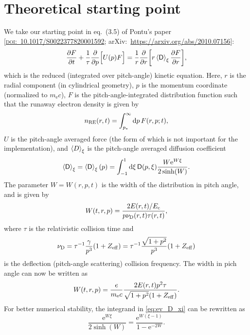 \documentclass[11pt,a4paper,english
]{article}
\newcommand{\ee}{\mathrm{e}}
\newcommand{\nRE}{\ensuremath{n_{\rm RE}}}
\newcommand{\nuD}{\ensuremath{\nu_{\rm D}}}
\newcommand{\nus}{\ensuremath{\nu_{\rm s}}}
\begin{document}
\section{Theoretical starting point}
We take our starting point in eq.~(3.5) of Pontu's paper
[\href{https://doi.org/10.1017/S0022377820001592}{\textsc{doi}:~10.1017/S0022377820001592};
arXiv:~\url{https://arxiv.org/abs/2010.07156}]:
\begin{equation}\label{eq:reduced-kinetic}
\pdv{F}{t}+\frac{1}{\tau}\pdv{p}\qty[\Big.U(p)F]
=\frac{1}{r}\pdv{r}\qty[r\ev{\mathsf{D}}_\xi\pdv{F}{r}],
\end{equation}
which is the reduced (integrated over pitch-angle) kinetic
equation. Here, $r$ is the radial component (in cylindrical geometry),
$p$ is the momentum coordinate (normalized to $m_{\ee}c$), $F$ is the
pitch-angle-integrated distribution function such that the runaway
electron density is given by
\begin{equation}
\nRE(r,t) = \int_{p_*}^{\infty}\dd{p}F(r,p;t),
\end{equation}
$U$ is the pitch-angle averaged force (the form of which is not
important for the implementation),
and $\ev{D}_{\xi}$ is the pitch-angle averaged diffusion coefficient
\begin{equation}\label{eq:ev_D_xi}
\ev{\mathsf{D}}_{\xi}=\ev{\mathsf{D}}_{\xi}(p)
=\int_{-1}^{1}\dd{\xi} \mathsf{D}(p,\xi)\frac{W\ee^{W\xi}}{2\sinh(W)}.
\end{equation}
The parameter $W=W(r,p,t)$ is the width of the distribution in pitch
angle, and is given by
\begin{equation}
W(t,r,p) = \frac{2E(r,t)/E_{\rm c}}{p\nuD(r,t)\tau(r,t)},
\end{equation}
where $\tau$ is the relativistic collision time and
\begin{equation}
\nuD = \tau^{-1}\frac{\gamma}{p^3}(1+Z_{\rm eff})
= \tau^{-1}\frac{\sqrt{1+p^2}}{p^3}(1+Z_{\rm eff})
\end{equation}
is the deflection (pitch-angle scattering) collision
frequency. The width in pich angle can now be written as
\begin{equation}
W(t,r,p) = \frac{e}{m_{\ee}c}\frac{2E(r,t)p^2\tau}{\sqrt{1+p^2}(1+Z_{\rm eff})}.
\end{equation}
For better numerical stability, the integrand in \eqref{eq:ev_D_xi}
can be rewritten as
\begin{equation}
\frac{\ee^{W\xi}}{2\sinh(W)}
= \frac{\ee^{W(\xi-1)}}{1-\ee^{-2W}}.
\end{equation}
\end{document}

